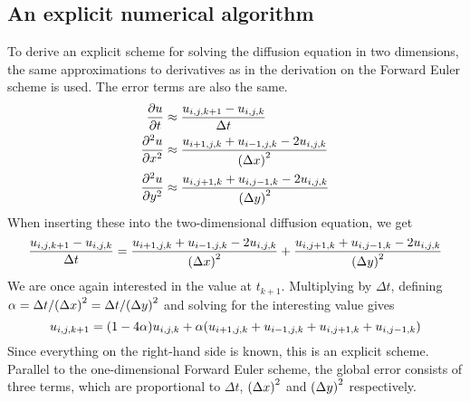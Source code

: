 \subsection{An explicit numerical algorithm}
To derive an explicit scheme for solving the diffusion equation in two dimensions, the same approximations to derivatives as in the derivation on the Forward Euler scheme is used. The error terms are also the same.
\begin{alignat*}{2}
    \pdv{u}{t} &\approx \frac{u_{i,j,k+1} - u_{i,j,k}}{\Delta t}\\
    \pdv[2]{u}{x} &\approx \frac{u_{i+1,j,k} + u_{i-1,j,k} - 2u_{i,j,k}}{\qty(\Delta x)^2}\\
    \pdv[2]{u}{y} &\approx \frac{u_{i,j+1,k} + u_{i,j-1,k} - 2u_{i,j,k}}{\qty(\Delta y)^2}
\end{alignat*}
When inserting these into the two-dimensional diffusion equation, we get
\[
    \frac{u_{i,j,k+1} - u_{i,j,k}}{\Delta t} =
    \frac{u_{i+1,j,k} + u_{i-1,j,k} - 2u_{i,j,k}}{\qty(\Delta x)^2} +
    \frac{u_{i,j+1,k} + u_{i,j-1,k} - 2u_{i,j,k}}{\qty(\Delta y)^2}
\]
We are once again interested in the value at \(t_{k+1}\). Multiplying by \(\Delta t\), defining \(\alpha=\Delta t/\qty(\Delta x)^2=\Delta t/\qty(\Delta y)^2\) and solving for the interesting value gives
\[
    u_{i,j,k+1} = \qty(1-4\alpha)u_{i,j,k} + \alpha\qty(u_{i+1,j,k} + u_{i-1,j,k} + u_{i,j+1,k} + u_{i,j-1,k})
\]
Since everything on the right-hand side is known, this is an explicit scheme. Parallel to the one-dimensional Forward Euler scheme, the global error consists of three terms, which are proportional to \(\Delta t\), \(\qty(\Delta x)^2\) and \(\qty(\Delta y)^2\) respectively.
